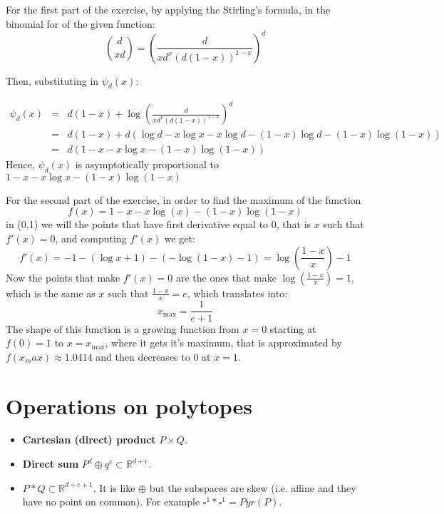 \begin{description}
\bigskip
For the first part of the exercise, by applying the Stirling's formula, in the binomial for of the given function:
\[\binom{d}{xd} = \left(\frac{d}{xd^x (d(1-x))^{1-x}}\right)^d\]

Then, substituting in $\psi_d(x)$:

\begin{eqnarray*}
\psi_d(x) &=& d(1-x) + \log \left(\frac{d}{xd^x (d(1-x))^{1-x}}\right)^d \\
&=& d(1-x) + d\left(\log{d} - x\log{x} - x\log{d} - (1-x)\log{d} - (1-x) \log{(1-x)}\right)\\
&=& d (1-x-x\log x - (1-x)\log(1-x))
\end{eqnarray*}
Hence, $\psi_d(x)$ is asymptotically proportional to $1-x-x\log x - (1-x)\log(1-x)$
\bigskip

For the second part of the exercise, in order to find the maximum of the function
\begin{equation*}
f(x)=1-x-x\log(x)-(1-x)\log(1-x)
\end{equation*}
in (0,1) we will the points that have first derivative equal to 0, that is $x$ such that $f'(x)=0$, and computing $f'(x)$ we get:
\begin{equation*}
f'(x)=-1-(\log x+1)-(-\log(1-x)-1)=\log\left(\frac{1-x}{x}\right)-1
\end{equation*}
Now the points that make $f'(x)=0$ are the ones that make $\log(\frac{1-x}{x})=1$, which is the same as $x$ such that $\frac{1-x}{x}=e$, which translates into:
\begin{equation*}
x_{\max}=\frac{1}{e+1}
\end{equation*}
The shape of this function is a growing function from $x=0$ starting at $f(0)=1$ to $x=x_{\max}$, where it gets it's maximum, that is approximated by $f(x_max)\approx1.0414$  and then decreases to $0$ at $x=1$.
\end{description}

\section{Operations on polytopes}
\begin{itemize}
\item \textbf{Cartesian (direct) product} $P\times Q$.
\item \textbf{Direct sum} $P^d \oplus q^e \subset \mathbb{R}^{d+e}$.
\item $P*Q\subset \mathbb{R}^{d+e+1}$. It is like $\oplus$ but the subspaces are skew (i.e. affine and they have no point on common). For example $\square^1 *\square^1 = Pyr(P)$.
\end{itemize}

